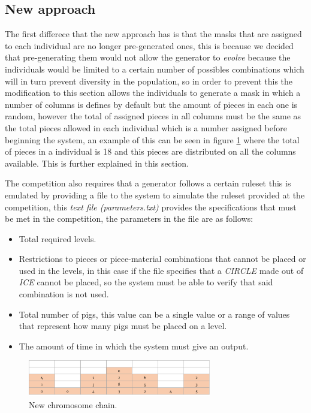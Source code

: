 \documentclass[conference]{IEEEtran}
\begin{document}
\subsection{New approach}

The first differece that the new approach has is that the masks that are assigned
to each individual are no longer pre-generated ones, this is because we decided
that pre-generating them would not allow the generator to \textit{evolve}
because the individuals would be limited to a certain number of possibles
combinations which will in turn prevent diversity in the population, so in order
to prevent this the modification to this section allows the individuals to
generate a mask in which a number of columns is defines by default but the
amount of pieces in each one is random, however the total of assigned pieces in
all columns must be the same as the total pieces allowed in each individual
which is a number assigned before beginning the system, an example of this
can be seen in figure \ref{new_chrom} where the total of pieces in a individual
is 18 and this pieces are distributed on all the columns available. This is
further explained in this section.

The competition also requires that a generator follows a certain ruleset this is 
emulated by providing a file to the system to simulate the ruleset provided at the 
competition, this \textit{text file
(parameters.txt)} provides the specifications that must be met in the
competition, the parameters in the file are as follows:

\begin{itemize}
    \item Total required levels.
    \item Restrictions to pieces or piece-material combinations that cannot be
    placed or used in the levels, in this case if the file specifies that a
    \textit{CIRCLE} made out of \textit{ICE} cannot be placed, so the system must be
    able to verify that said combination is not used.
    \item Total number of pigs, this value can be a single value or a range of
    values that represent how many pigs must be placed on a level.
    \item The amount of time in which the system must give an output.
\end{itemize}

\begin{figure}[htbp]
\centerline{\includegraphics[width=80mm]{Images/chromosome_chain_new_model.png}}
\caption{New chromosome chain.}
\label{new_chrom}
\end{figure}
\end{document}
